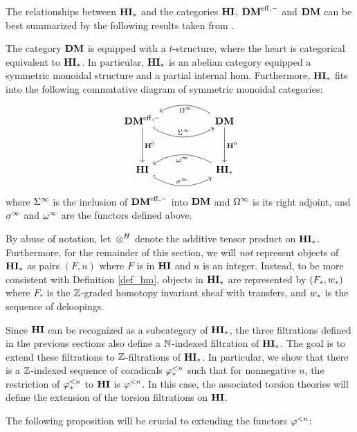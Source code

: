 The relationships between $\mathbf{HI}_*$ and the categories $\mathbf{HI}$, $\mathbf{DM}^{\mathrm{eff},-}$ 
and $\mathbf{DM}$ can be best summarized by the following results taken
from \cite{DegModHom}.

\begin{prop}
The category $\mathbf{DM}$ is equipped with a $t$-structure, where the 
heart is categorical equivalent to $\mathbf{HI}_*$. In particular, $\mathbf{HI}_*$ is 
an abelian category equipped a symmetric monoidal structure and a 
partial internal hom. Furthermore, $\mathbf{HI}_*$ fits into the following 
commutative diagram of symmetric monoidal categories:
\begin{equation}\label{eq_hm_hi_com_diag}
\begin{tikzcd}[column sep=huge, row sep=huge]
\DMeff \arrow[hookrightarrow, bend right]{r}{\spectDM} \arrow{d}{\HH^0} &
\DM \arrow{d}{\HH^0} \arrow[bend right]{l}{\loopDM}\\
\HI \arrow[hookrightarrow, bend right]{r}{\spectHI} &
\HM \arrow[bend right]{l}{\loopHM}
\end{tikzcd}
\end{equation}
where $\Sigma^\infty$ is the inclusion of $\mathbf{DM}^{\mathrm{eff},-}$ into $\mathbf{DM}$ and 
$\Omega^\infty$ is its right adjoint, and $\sigma^\infty$ and $\omega^\infty$ are 
the functors defined above.
\end{prop}

By abuse of notation, let $\,\otimes^H$ denote the additive tensor 
product on $\mathbf{HI}_*$. Furthermore, for the remainder of this section, 
we will \emph{not} represent objects of $\mathbf{HI}_*$ as pairs $(F, n)$ 
where $F$ is in $\mathbf{HI}$ and $n$ is an integer. Instead, to be more
consistent with Definition \ref{def_hm}, objects in $\mathbf{HI}_*$ are 
represented by $(F_*, w_*)$ where $F_*$ is the $\mathbb{Z}$-graded 
homotopy invariant sheaf with transfers, and $w_*$ is the 
sequence of deloopings.

Since $\mathbf{HI}$ can be recognized as a subcategory of $\mathbf{HI}_*$, the
three filtrations defined in the previous sections also define
a $\mathbb{N}$-indexed filtration of $\mathbf{HI}_*$. The goal is to extend these
filtrations to $\mathbb{Z}$-filtrations of $\mathbf{HI}_*$. In particular, we show
that there is a $\mathbb{Z}$-indexed sequence of coradicals $\varphi^{< n}_{*}$
such that for nonnegative $n$, the restriction of $\varphi^{< n}_{*}$ to
$\mathbf{HI}$ is $\varphi^{< n}$. In this case, the associated
torsion theories will define the extension of the torsion 
filtrations on $\mathbf{HI}$.

The following proposition will be crucial to extending the 
functors $\varphi^{< n}$:

